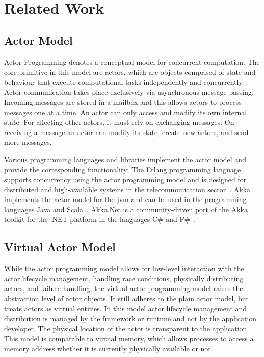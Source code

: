 
\section{Related Work}

  \subsection{Actor Model}
  Actor Programming denotes a conceptual model for concurrent computation.
  The core primitive in this model are actors, which are objects comprised of state and behaviour that execute computational tasks independently and concurrently.
  Actor communication takes place exclusively via asynchronous message passing.
  Incoming messages are stored in a mailbox and this allows actors to process messages one at a time.
  An actor can only access and modify its own internal state.
  For affecting other actors, it must rely on exchanging messages.
  On receiving a message an actor can modify its state, create new actors, and send more messages.

  Various programming languages and libraries implement the actor model and provide the corresponding functionality:
  The Erlang programming language supports concurrency using the actor programming model and is designed for distributed and high-available systems in the telecommunication sector~\cite{armstrong:erlang}.
  Akka implements the actor model for the \gls{jvm} and can be used in the programming languages Java and Scala~\cite{akka}.
  Akka.Net is a community-driven port of the Akka toolkit for the .NET platform in the languages C\# and F\#~\cite{akka.net}.

  \subsection{Virtual Actor Model}
  While the actor programming model allows for low-level interaction with the actor lifecycle management, handling race conditions, physically distributing actors, and failure handling, the virtual actor programming model raises the abstraction level of actor objects.
  It still adheres to the plain actor model, but treats actors as virtual entities.
  In this model actor lifecycle management and distribution is managed by the framework or runtime and not by the application developer.
  The physical location of the actor is transparent to the application.
  This model is comparable to virtual memory, which allows processes to access a memory address whether it is currently physically available or not.

